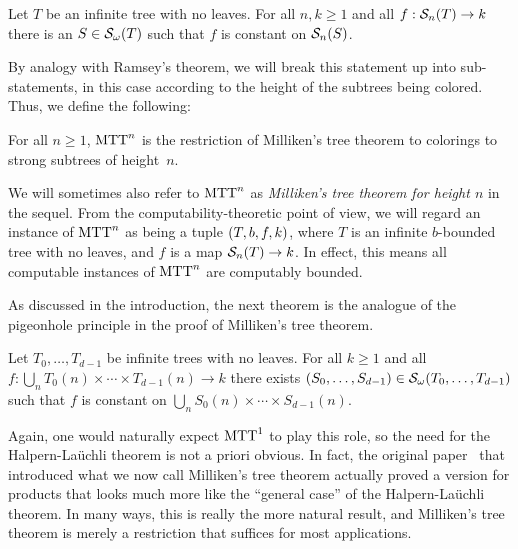 \begin{theorem}\label{th:milliken-theorem}
	Let $T$ be an infinite tree with no leaves. For all $n,k \geq 1$ and all $f:\mathcal{S}_{n}({T}) \to k$ there is an $S \in \mathcal{S}_{\omega}({T})$ such that $f$ is constant on $\mathcal{S}_{n}({S})$.
\end{theorem}

By analogy with Ramsey's theorem, we will break this statement up into sub-statements, in this case according to the height of the subtrees being colored. Thus, we define the following:

\begin{statement}
For all $n \geq 1$, $\mathrm{MTT}^{n}_{}$ is the restriction of Milliken's tree theorem to colorings to strong subtrees of height~$n$.
\end{statement}

\noindent We will sometimes also refer to $\mathrm{MTT}^{n}_{}$ as \emph{Milliken's tree theorem for height $n$} in the sequel. From the computability-theoretic point of view, we will regard an instance of $\mathrm{MTT}^{n}_{}$ as being a tuple $( T,b,f,k )$, where $T$ is an infinite $b$-bounded tree with no leaves, and $f$ is a map $\mathcal{S}_{n}({T}) \to k$. In effect, this means all computable instances of $\mathrm{MTT}^{n}_{}$ are computably bounded.

As discussed in the introduction, the next theorem is the analogue of the pigeonhole principle in the proof of Milliken's tree theorem.

\begin{theorem}\label{th:strong-hl}
	Let $T_0,\ldots,T_{d-1}$ be infinite trees with no leaves. For all $k \geq 1$ and all $f: \bigcup_{n} T_0(n) \times \cdots \times T_{d-1}(n) \to k$ there exists $(S_0,\ldots,S_{d-1}) \in \mathcal{S}_{\omega}({T_0,\ldots,T_{d-1}})$ such that $f$ is constant on $\bigcup_{n} S_0(n) \times \cdots \times S_{d-1}(n)$.
\end{theorem}

\noindent Again, one would naturally expect $\mathrm{MTT}^{1}_{}$ to play this role, so the need for the Halpern-La\"{u}chli theorem is not a priori obvious. In fact, the original paper~\cite{Milliken1979RTforTrees} that introduced what we now call Milliken's tree theorem actually proved a version for products that looks much more like the ``general case'' of the Halpern-La\"{u}chli theorem. In many ways, this is really the more natural result, and Milliken's tree theorem is merely a restriction that suffices for most applications.

